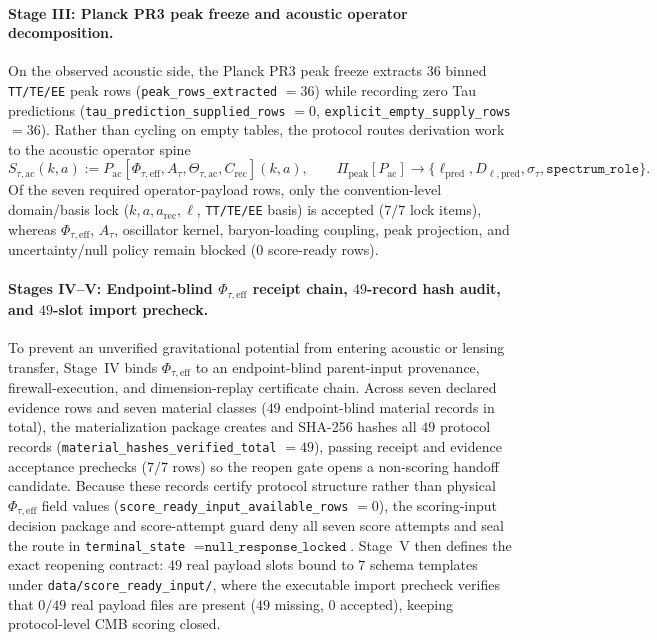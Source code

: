 \documentclass[11pt]{article}
\begin{document}
\paragraph{Stage III: Planck PR3 peak freeze and acoustic operator decomposition.}
On the observed acoustic side, the Planck PR3 peak freeze extracts $36$ binned
\texttt{TT/TE/EE} peak rows (\texttt{peak\_\allowbreak{}rows\_\allowbreak{}extracted} $=36$) while
recording zero Tau predictions (\texttt{tau\_\allowbreak{}prediction\_\allowbreak{}supplied\_\allowbreak{}rows} $=0$,
\texttt{explicit\_\allowbreak{}empty\_\allowbreak{}supply\_\allowbreak{}rows} $=36$). Rather than cycling on empty
tables, the protocol routes derivation work to the acoustic operator spine
\[
S_{\tau,\mathrm{ac}}(k,a):=P_{\mathrm{ac}}\!\left[\Phi_{\tau,\mathrm{eff}},A_\tau,\Theta_{\tau,\mathrm{ac}},C_{\mathrm{rec}}\right](k,a),
\qquad
\Pi_{\mathrm{peak}}[P_{\mathrm{ac}}]\to\{\ell_{\mathrm{pred}},D_{\ell,\mathrm{pred}},\sigma_\tau,\texttt{spectrum\_role}\}.
\]
Of the seven required operator-payload rows, only the convention-level
domain/basis lock ($k,a,a_{\mathrm{rec}},\ell$, \texttt{TT/TE/EE} basis) is
accepted ($7/7$ lock items), whereas $\Phi_{\tau,\mathrm{eff}}$, $A_\tau$,
oscillator kernel, baryon-loading coupling, peak projection, and
uncertainty/null policy remain blocked ($0$ score-ready rows).

\paragraph{Stages IV--V: Endpoint-blind $\Phi_{\tau,\mathrm{eff}}$ receipt chain, $49$-record hash audit, and $49$-slot import precheck.}
To prevent an unverified gravitational potential from entering acoustic or
lensing transfer, Stage~IV binds $\Phi_{\tau,\mathrm{eff}}$ to an
endpoint-blind parent-input provenance, firewall-execution, and
dimension-replay certificate chain. Across seven declared evidence rows and
seven material classes ($49$ endpoint-blind material records in total), the
materialization package creates and SHA-256 hashes all $49$ protocol records
(\texttt{material\_hashes\_verified\_total} $=49$), passing receipt and
evidence acceptance prechecks ($7/7$ rows) so the reopen gate opens a
non-scoring handoff candidate. Because these records certify protocol structure
rather than physical $\Phi_{\tau,\mathrm{eff}}$ field values
(\texttt{score\_ready\_input\_available\_rows} $=0$), the scoring-input
decision package and score-attempt guard deny all seven score attempts and seal
the route in \texttt{terminal\_state} $=\texttt{null\_response\_locked}$.
Stage~V then defines the exact reopening contract: $49$ real payload slots
bound to $7$ schema templates under \texttt{data/score\_ready\_input/}, where
the executable import precheck verifies that $0/49$ real payload files are
present ($49$ missing, $0$ accepted), keeping protocol-level CMB scoring
closed.
\end{document}
